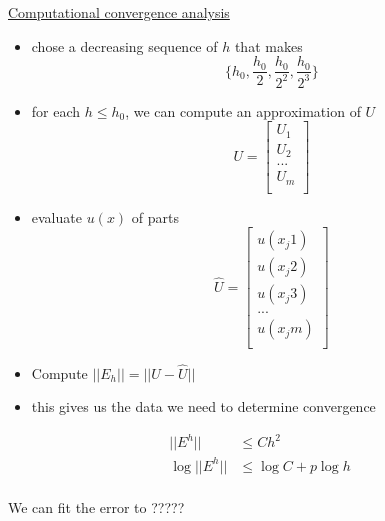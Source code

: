 \documentclass[10pt]{article}
\newcommand{\1}{\mathbb{1}}
\begin{document}
    \underline{Computational convergence analysis}\\
    \begin{itemize}
        \item chose a decreasing sequence of $h$ that makes
            \[\{h_0, \frac{h_0}{2}, \frac{h_0}{2^2}, \frac{h_0}{2^3}\}\]
        \item for each $h \leq h_0$, we can compute an approximation of $U$
            \[U = \begin{bmatrix}
                U_1\\
                U_2\\
                ...\\
                U_m\\
            \end{bmatrix}\]
        \item evaluate $u(x)$ of parts
            \[\hat{U} = \begin{bmatrix}
                u(x_j1)\\
                u(x_j2)\\
                u(x_j3)\\
                ...\\
                u(x_jm)\\
            \end{bmatrix}\]
        \item Compute $||E_h|| = ||U - \hat{U}||$
        \item this gives us the data we need to determine convergence
        \end{itemize}

        \begin{align*}
            ||E^h|| &\leq C h^2\\
            \log ||E^h|| &\leq \log C + p \log h\\
        \end{align*}

        We can fit the error to ?????\\
\end{document}
